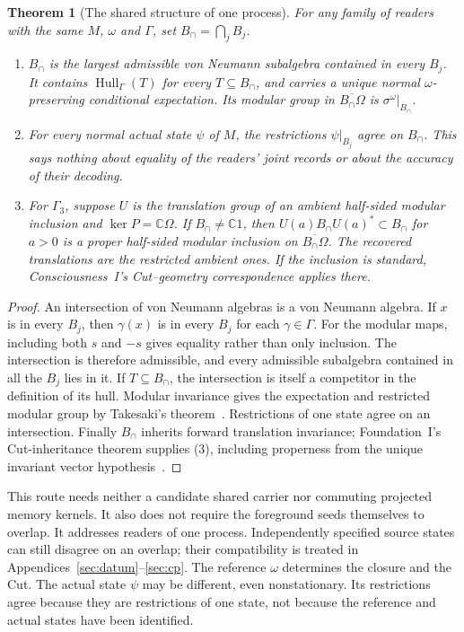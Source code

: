 \documentclass[12pt]{article}
\newtheorem{theorem}{Theorem}[section]
\theoremstyle{definition}
\theoremstyle{remark}
\begin{document}
\begin{theorem}[The shared structure of one process]\label{thm:onesource}
For any family of readers with the same $M$, $\omega$ and $\Gamma$, set
$B_\cap=\bigcap_jB_j$.
\begin{enumerate}
\item $B_\cap$ is the largest admissible von Neumann subalgebra contained in
every $B_j$. It contains $\operatorname{Hull}_\Gamma(T)$ for every
$T\subseteq B_\cap$, and carries a unique normal $\omega$-preserving conditional
expectation. Its modular group in $\overline{B_\cap\Omega}$ is
$\sigma^\omega|_{B_\cap}$.
\item For every normal actual state $\psi$ of $M$, the restrictions
$\psi|_{B_j}$ agree on $B_\cap$. This says nothing about equality of the readers'
joint records or about the accuracy of their decoding.
\item For $\Gamma_3$, suppose $U$ is the translation group of an ambient
half-sided modular inclusion and $\ker P=\mathbb C\Omega$. If
$B_\cap\ne\mathbb C1$, then $U(a)B_\cap U(a)^*\subset B_\cap$ for $a>0$
is a proper half-sided modular inclusion on $\overline{B_\cap\Omega}$.
The recovered translations are the restricted ambient ones. If the inclusion
is standard, Consciousness~I's Cut--geometry correspondence applies there.
\end{enumerate}
\end{theorem}
\begin{proof}
An intersection of von Neumann algebras is a von Neumann algebra. If $x$ is
in every $B_j$, then $\gamma(x)$ is in every $B_j$ for each $\gamma\in\Gamma$.
For the modular maps, including both $s$ and $-s$ gives equality rather than
only inclusion. The intersection is therefore admissible, and every admissible
subalgebra contained in all the $B_j$ lies in it. If $T\subseteq B_\cap$, the
intersection is itself a competitor in the definition of its hull.
Modular invariance gives the expectation and restricted modular group by
Takesaki's theorem~\cite{Takesaki1972,Hiai2021}. Restrictions of one state agree
on an intersection. Finally $B_\cap$ inherits forward translation invariance;
Foundation~I's Cut-inheritance theorem supplies (3), including properness from
the unique invariant vector hypothesis~\cite[section on Cuts in the hull]{FoundationI}.
\end{proof}

This route needs neither a candidate shared carrier nor commuting projected
memory kernels. It also does not require the foreground seeds themselves to
overlap. It addresses readers of one process. Independently specified source
states can still disagree on an overlap; their compatibility is treated in
Appendices~\ref{sec:datum}--\ref{sec:cp}. The reference $\omega$ determines the
closure and the Cut. The actual state $\psi$ may be different, even nonstationary.
Its restrictions agree because they are restrictions of one state, not because
the reference and actual states have been identified.
\end{document}
